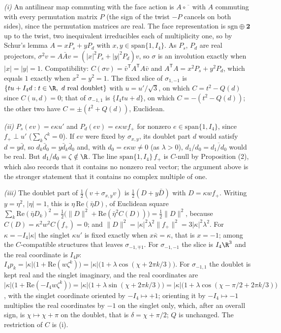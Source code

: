 \emph{(i)} An antilinear map commuting with the face action is $A \circ \overline{\phantom{v}}$ with $A$ commuting with every permutation matrix $P$ (the sign of the twist $-P$ cancels on both sides), since the permutation matrices are real. The face representation is $\mathrm{sgn} \oplus \mathbf{2}$ up to the twist, two inequivalent irreducibles each of multiplicity one, so by Schur's lemma $A = xP_{s} + yP_{d}$ with $x, y \in \mathrm{span}\{1, I_4\}$. As $P_{s}$, $P_{d}$ are real projectors, $\sigma^{2}v = A\bar{A}v = (|x|^{2}P_{s} + |y|^{2}P_{d})v$, so $\sigma$ is an involution exactly when $|x| = |y| = 1$. Compatibility: $C(\sigma v) = \bar{v}^{\mathsf{T}}A^{\mathsf{T}}A\bar{v}$ and $A^{\mathsf{T}}A = x^{2}P_{s} + y^{2}P_{d}$, which equals $1$ exactly when $x^{2} = y^{2} = 1$. The fixed slice of $\sigma_{1,-1}$ is $\{tu + I_4 d : t \in \R,\ d \text{ real doublet}\}$ with $u = u'/\sqrt3$, on which $C = t^{2} - Q(d)$ since $C(u, d) = 0$; that of $\sigma_{-1,1}$ is $\{I_4 tu + d\}$, on which $C = -(t^{2} - Q(d))$; the other two have $C = \pm(t^{2} + Q(d))$, Euclidean.

\emph{(ii)} $P_{s}(e v) = e\kappa u'$ and $P_{d}(e v) = e\kappa w f_{+}$ for nonzero $e \in \mathrm{span}\{1, I_4\}$, since $f_{+} \perp u'$ ($\sum_{k}\zeta^{k} = 0$). If $ev$ were fixed by $\sigma_{x,y}$, its doublet part $d$ would satisfy $d = y\bar{d}$, so $d_{k}\bar{d}_{0} = y\bar{d}_{k}\bar{d}_{0}$ and, with $d_{0} = e\kappa w \neq 0$ (as $\lambda > 0$), $d_{1}/d_{0} = \overline{d_{1}/d_{0}}$ would be real. But $d_{1}/d_{0} = \zeta \notin \R$. The line $\mathrm{span}\{1, I_4\}\,f_{+}$ is $C$-null by Proposition (2), which also records that it contains no nonzero real vector; the argument above is the stronger statement that it contains no complex multiple of one.

\emph{(iii)} The doublet part of $\tfrac12(v + \sigma_{x,y}v)$ is $\tfrac12(D + y\bar{D})$ with $D = \kappa w f_{+}$. Writing $y = \eta^{2}$, $|\eta| = 1$, this is $\eta\,\mathrm{Re}(\bar\eta D)$, of Euclidean square $\sum_{k}\mathrm{Re}(\bar\eta D_{k})^{2} = \tfrac12\bigl(\|D\|^{2} + \mathrm{Re}(\bar\eta^{2}C(D))\bigr) = \tfrac12\|D\|^{2}$, because $C(D) = \kappa^{2}w^{2}C(f_{+}) = 0$; and $\|D\|^{2} = |\kappa|^{2}\lambda^{2}\|f_{+}\|^{2} = 3|\kappa|^{2}\lambda^{2}$. For $\kappa = -I_4|\kappa|$ the singlet $\kappa u'$ is fixed exactly when $x\bar\kappa = \kappa$, that is $x = -1$; among the $C$-compatible structures that leaves $\sigma_{-1,\mp1}$. For $\sigma_{-1,-1}$ the slice is $I_4\R^{3}$ and the real coordinate is $I_4 p$: $I_4 p_{k} = |\kappa|\bigl(1 + \mathrm{Re}(w\zeta^{k})\bigr) = |\kappa|\bigl(1 + \lambda\cos(\chi + 2\pi k/3)\bigr)$. For $\sigma_{-1,1}$ the doublet is kept real and the singlet imaginary, and the real coordinates are $|\kappa|\bigl(1 + \mathrm{Re}(-I_4 w\zeta^{k})\bigr) = |\kappa|\bigl(1 + \lambda\sin(\chi + 2\pi k/3)\bigr) = |\kappa|\bigl(1 + \lambda\cos(\chi - \pi/2 + 2\pi k/3)\bigr)$, with the singlet coordinate oriented by $-I_4 \mapsto +1$; orienting it by $-I_4 \mapsto -1$ multiplies the real coordinates by $-1$ on the singlet only, which, after an overall sign, is $\chi \mapsto \chi + \pi$ on the doublet, that is $\delta = \chi + \pi/2$; $Q$ is unchanged. The restriction of $C$ is (i).

